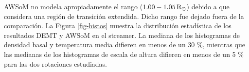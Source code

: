 \documentclass[baaa]{baaa}
\begin{document}
AWSoM no modela apropiadamente el rango ($1.00 - 1.05\,{\rm R_\odot}$) debido a que considera una región de transición extendida. Dicho rango fue dejado fuera de la comparación. La Figura \ref{fig-histos} muestra la distribución estadística de los resultados DEMT y AWSoM en el streamer. La mediana de los histogramas de densidad basal y temperatura media difieren en menos de un 30 \%, mientras que las medianas de los histogramas de escala de altura difieren en menos de un 5 \% para las dos rotaciones estudiadas.

\end{document}
